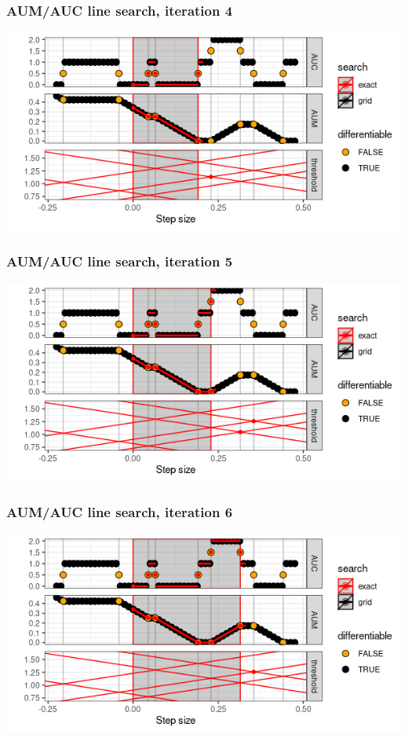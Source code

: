 \begin{frame}
  \frametitle{AUM/AUC line search, iteration 4}
  \includegraphics[width=\textwidth]{figure-line-search-example-4}
\end{frame}


\begin{frame}
  \frametitle{AUM/AUC line search, iteration 5}
  \includegraphics[width=\textwidth]{figure-line-search-example-5}
\end{frame}


\begin{frame}
  \frametitle{AUM/AUC line search, iteration 6}
  \includegraphics[width=\textwidth]{figure-line-search-example-6}
\end{frame}


